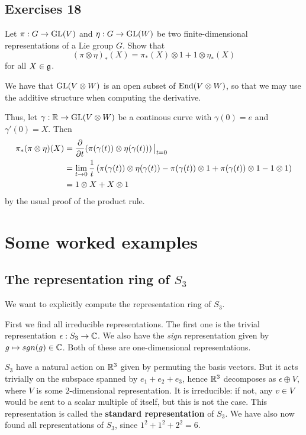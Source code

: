\documentclass[11pt, english]{article}
\begin{document}
\subsection{Exercises 18}

\begin{exc}[Exc 2]
Let $\pi:G \to \operatorname{GL}(V)$ and $\eta:G \to \operatorname{GL}(W)$ be two finite-dimensional representations of a Lie group $G$. Show that 
$$
(\pi \otimes \eta)_\ast(X) = \pi_\ast(X) \otimes 1 + 1 \otimes \eta_\ast(X)
$$
for all $X \in \frak g$.
\end{exc}

\begin{sol}
We have that $\operatorname{GL}(V \otimes W)$ is an open subset of $\operatorname{End}(V \otimes W)$, so that we may use the additive structure when computing the derivative.

Thus, let $\gamma:\mathbb{R} \to \operatorname{GL}(V \otimes W)$ be a continous curve with $\gamma(0)=e$ and $\gamma'(0)=X$. Then
\begin{align*}
  \pi_\ast(\pi \otimes \eta)(X) &= \dd{}{t}\restr{\left(
\pi(\gamma(t)) \otimes\eta(\gamma(t))
\right)}{t = 0} \\
&= \lim_{t \to 0} \frac 1t \left( \pi(\gamma(t)) \otimes \eta(\gamma(t)) - \pi(\gamma(t)) \otimes 1 + \pi(\gamma(t)) \otimes 1 - 1 \otimes 1 \right)\\
&= 1 \otimes X + X \otimes 1
\end{align*}
by the usual proof of the product rule.
\end{sol}


\section{Some worked examples}

\subsection{The representation ring of $S_3$}

We want to explicitly compute the representation ring of $S_3$.

First we find all irreducible representations. The first one is the trivial representation $\epsilon:S_3 \to \mathbb{C}$. We also have the \emph{sign} representation given by $g \mapsto  sgn(g) \in \mathbb{C} $. Both of these are one-dimensional representations.

$S_3$ have a natural action on $\mathbb{R}^3$ given by permuting the basis vectors. But it acts trivially on the subspace spanned by $e_1+e_2+e_3$, hence $\mathbb{R}^3$ decomposes as $\epsilon \oplus V$, where $V$ is some $2$-dimensional representation. It is irreducible: if not, any $v \in V$ would be sent to a scalar multiple of itself, but this is not the case. This representation is called the \textbf{standard representation} of $S_3$. We have also now found all representations of $S_3$, since $1^2+1^2+2^2=6$. 
\end{document}
